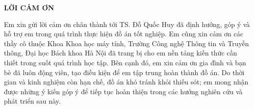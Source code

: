 \documentclass[../DoAn.tex]{subfiles}
\begin{document}
\begin{center}
    \Large{\textbf{LỜI CẢM ƠN}}\\
\end{center}
\vspace{1cm}

Em xin gửi lời cảm ơn chân thành tới TS. Đỗ Quốc Huy đã định hướng, góp ý và hỗ trợ em trong quá trình thực hiện đồ án tốt nghiệp. Em cũng xin cảm ơn các thầy cô thuộc Khoa Khoa học máy tính, Trường Công nghệ Thông tin và Truyền thông, Đại học Bách khoa Hà Nội đã trang bị cho em nền tảng kiến thức cần thiết trong suốt quá trình học tập. Bên cạnh đó, em xin cảm ơn gia đình và bạn bè đã luôn động viên, tạo điều kiện để em tập trung hoàn thành đồ án. Do thời gian và kinh nghiệm còn hạn chế, đồ án khó tránh khỏi thiếu sót; em mong nhận được những ý kiến góp ý để tiếp tục hoàn thiện trong các hướng nghiên cứu và phát triển sau này.
\end{document}
